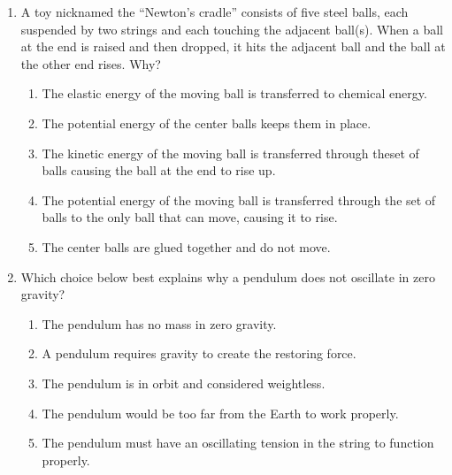 \documentclass{../../../oss-apphys}
\begin{document}
\begin{multicols}{2}
\begin{enumerate}[leftmargin=18pt]
  \item  A toy nicknamed the ``Newton’s cradle'' consists of five steel balls,
    each suspended by two strings and each touching the adjacent ball(s).
    When a ball at the end is raised and then dropped, it hits the adjacent
    ball and the ball at the other end rises. Why?
    \begin{enumerate}[noitemsep,topsep=0pt,leftmargin=18pt,label=(\Alph*)]
    \item The elastic energy of the moving ball is transferred to chemical
      energy.
    \item The potential energy of the center balls keeps them in place.
    \item The kinetic energy of the moving ball is transferred through theset
      of balls causing the ball at the end to rise up.
    \item The potential energy of the moving ball is transferred through the
      set of balls to the only ball that can move, causing it to rise.
    \item The center balls are glued together and do not move.
    \end{enumerate}
    \columnbreak
    
  \item Which choice below best explains why a pendulum does not oscillate
    in zero gravity?
    \begin{enumerate}[noitemsep,topsep=0pt,leftmargin=18pt,label=(\Alph*)]
    \item The pendulum has no mass in zero gravity.
    \item A pendulum requires gravity to create the restoring force.
    \item The pendulum is in orbit and considered weightless.
    \item The pendulum would be too far from the Earth to work properly.
    \item The pendulum must have an oscillating tension in the string to
      function properly.
    \end{enumerate}
    


\end{enumerate}
\end{multicols}
\end{document}
